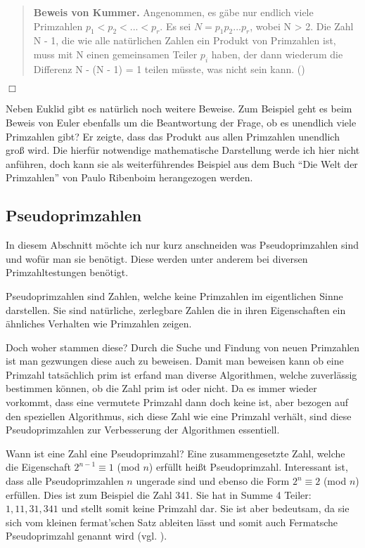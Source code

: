 \documentclass[12pt,a4paper]{article}
\theoremstyle{definition}
\begin{document}
\begin{quote}
\small
\textbf{Beweis von Kummer.} Angenommen, es gäbe nur endlich viele Primzahlen $p_1 < p_2 <...< p_r$.
Es sei $N = p_1p_2...p_r$, wobei N > 2.
Die Zahl N - 1, die wie alle natürlichen Zahlen ein Produkt von Primzahlen ist, muss mit N einen gemeinsamen Teiler $p_i$ haben, der dann wiederum die Differenz N - (N - 1) = 1 teilen müsste, was nicht sein kann. (\cite[4]{Ribenboim2006})
\end{quote}
\begin{flushright}
$\Box$
\end{flushright}

Neben Euklid gibt es natürlich noch weitere Beweise.
Zum Beispiel geht es beim Beweis von Euler ebenfalls um die Beantwortung der Frage, ob es unendlich viele Primzahlen gibt?
Er zeigte, dass das Produkt aus allen Primzahlen unendlich groß wird.
Die hierfür notwendige mathematische Darstellung werde ich hier nicht anführen, doch kann sie als weiterführendes Beispiel aus dem Buch “Die Welt der Primzahlen” von Paulo Ribenboim herangezogen werden.

\subsection{Pseudoprimzahlen}\label{Pseudoprimzahlen}
In diesem Abschnitt möchte ich nur kurz anschneiden was Pseudoprimzahlen sind und wofür man sie benötigt.
Diese werden unter anderem bei diversen Primzahltestungen benötigt.

Pseudoprimzahlen sind Zahlen, welche keine Primzahlen im eigentlichen Sinne darstellen.
Sie sind natürliche, zerlegbare Zahlen die in ihren Eigenschaften ein ähnliches Verhalten wie Primzahlen zeigen.

Doch woher stammen diese?\newline
Durch die Suche und Findung von neuen Primzahlen ist man gezwungen diese auch zu beweisen.
Damit man beweisen kann ob eine Primzahl tatsächlich prim ist erfand man diverse Algorithmen, welche zuverlässig bestimmen können, ob die Zahl prim ist oder nicht.
Da es immer wieder vorkommt, dass eine vermutete Primzahl dann doch keine ist, aber bezogen auf den speziellen Algorithmus, sich diese Zahl wie eine Primzahl verhält, sind diese Pseudoprimzahlen zur Verbesserung der Algorithmen essentiell.

Wann ist eine Zahl eine Pseudoprimzahl?\newline
Eine zusammengesetzte Zahl, welche die Eigenschaft $2^{n-1}\equiv 1$ (mod $n$) erfüllt heißt Pseudoprimzahl.
Interessant ist, dass alle Pseudoprimzahlen $n$ ungerade sind und ebenso die Form $2^n \equiv 2$ (mod $n$) erfüllen. 
Dies ist zum Beispiel die Zahl 341.
Sie hat in Summe 4 Teiler: $1, 11, 31, 341$ und stellt somit keine Primzahl dar.
Sie ist aber bedeutsam, da sie sich vom kleinen fermat'schen Satz ableiten lässt und somit auch Fermatsche Pseudoprimzahl genannt wird (vgl. \cite[91]{Ribenboim2006}).
\end{document}
